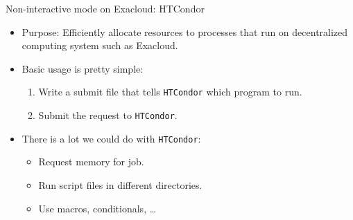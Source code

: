 \documentclass[12pt,t,xcolor=table]{beamer}
\begin{document}
\begin{frame}[fragile,label={sec:orgheadline20}]{Non-interactive mode on Exacloud: HTCondor}
 \vspace{0.5em}

\begin{itemize}
\item Purpose: Efficiently allocate resources to processes that run on decentralized computing system such as Exacloud.\setlength\itemsep{0.75em}

\item Basic usage is pretty simple: 

\begin{enumerate}
\item Write a submit file that tells \texttt{HTCondor} which program to run.

\item Submit the request to \texttt{HTCondor}.
\end{enumerate}

\item There is a lot we could do with \texttt{HTCondor}:

\begin{itemize}
\item Request memory for job.

\item Run script files in different directories.

\item Use macros, conditionals, \ldots{}
\end{itemize}
\end{itemize}
\end{frame}
\end{document}
